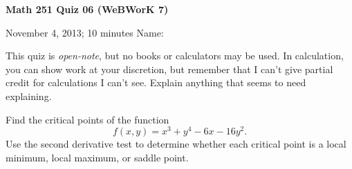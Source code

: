 \documentclass[12pt]{exam}
\begin{document}
\noindent
\textbf{{\large Math 251 \hfill Quiz 06 (WeBWorK 7)}}

\noindent
November 4, 2013; 10 minutes \hfill Name: \underline{\hspace{3in}} 

\noindent

\noindent
This quiz is \emph{open-note}, but no books or calculators may be used.
In calculation, you can show work at your discretion, but remember that
I can't give partial credit for calculations I can't see. Explain
anything that seems to need explaining.

\begin{questions} 

\question[18] Find the critical points of the function 
\begin{equation*}
f(x,y) = x^3 + y^4 - 6x - 16y^2.
\end{equation*}
Use the second derivative test to determine whether each critical point is a local minimum, local maximum, or saddle point.


\end{questions} 
\end{document}
